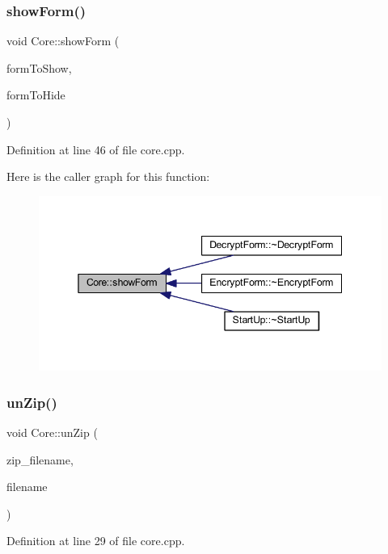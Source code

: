 \subsubsection{\texorpdfstring{show\+Form()}{showForm()}}
{\footnotesize\ttfamily void Core\+::show\+Form (\begin{DoxyParamCaption}\item[{\hyperlink{class_q_widget}{Q\+Widget} $\ast$}]{form\+To\+Show,  }\item[{\hyperlink{class_q_widget}{Q\+Widget} $\ast$}]{form\+To\+Hide }\end{DoxyParamCaption})}



Definition at line 46 of file core.\+cpp.

Here is the caller graph for this function\+:\nopagebreak
\begin{figure}[H]
\begin{center}
\leavevmode
\includegraphics[width=345pt]{class_core_ad3503f8f37ca8f8f31bbdefb273a9f78_icgraph}
\end{center}
\end{figure}
\hypertarget{class_core_a76ef88295ccbf20180de6273a2d387bc}{}\label{class_core_a76ef88295ccbf20180de6273a2d387bc} 
\subsubsection{\texorpdfstring{un\+Zip()}{unZip()}}
{\footnotesize\ttfamily void Core\+::un\+Zip (\begin{DoxyParamCaption}\item[{Q\+String}]{zip\+\_\+filename,  }\item[{Q\+String}]{filename }\end{DoxyParamCaption})}



Definition at line 29 of file core.\+cpp.

